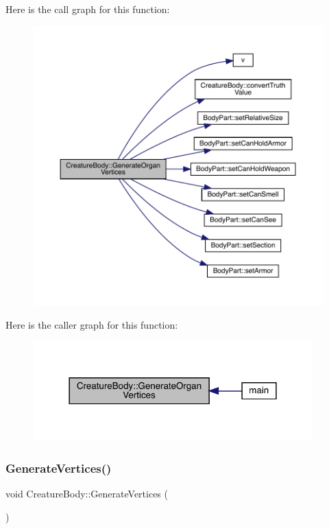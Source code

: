 Here is the call graph for this function\+:
\nopagebreak
\begin{figure}[H]
\begin{center}
\leavevmode
\includegraphics[width=350pt]{class_creature_body_a9cf5cffe6209ed851bf32c2b164d9391_cgraph}
\end{center}
\end{figure}
Here is the caller graph for this function\+:
\nopagebreak
\begin{figure}[H]
\begin{center}
\leavevmode
\includegraphics[width=306pt]{class_creature_body_a9cf5cffe6209ed851bf32c2b164d9391_icgraph}
\end{center}
\end{figure}
\mbox{\label{class_creature_body_af7047fb13005abbb9a816c0dd64af873}} 
\subsubsection{\texorpdfstring{Generate\+Vertices()}{GenerateVertices()}}
{\footnotesize\ttfamily void Creature\+Body\+::\+Generate\+Vertices (\begin{DoxyParamCaption}{ }\end{DoxyParamCaption})}

